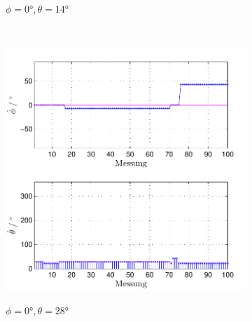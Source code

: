 \begin{figure}
\begin{subfigure}[b]{0.48\textwidth}
                \label{fig:Foto_DSP_Draufsicht}
                \caption{$\phi=0°, \theta = 14°$}
        \end{subfigure}
        ~ %
        \begin{subfigure}[b]{0.48\textwidth}
                \centering
                \includegraphics[width=\textwidth]{images/04_Echtzeitversuch/MALE_Phi_0_Theta_28}
                \label{fig:Foto_DSP_Draufsicht}
                \caption{$\phi=0°, \theta = 28°$}
        \end{subfigure}
         ~ %
        \begin{subfigure}[b]{0.48\textwidth}
                \centering

\end{subfigure}
\end{figure}
